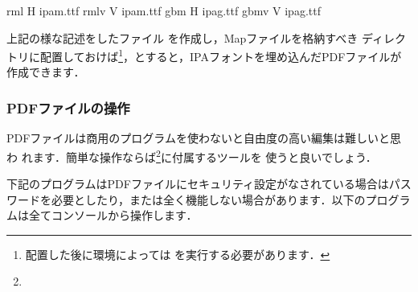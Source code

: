 \begin{plainfile}
rml  H ipam.ttf
rmlv V ipam.ttf
gbm  H ipag.ttf
gbmv V ipag.ttf
\end{plainfile}

上記の様な記述をしたファイル  を作成し，Mapファイルを格納すべき
ディレクトリに配置しておけば\footnote{配置した後に環境によっては
を実行する必要があります．}，とすると，IPAフォントを埋め込んだPDFファイルが作成できます．


\subsubsection{PDFファイルの操作}

PDFファイルは商用のプログラムを使わないと自由度の高い編集は難しいと思わ
れます．簡単な操作ならば\footnote{\webXpdf}に付属するツールを
使うと良いでしょう．

%
%

下記のプログラムはPDFファイルにセキュリティ設定がなされている場合はパス
ワードを必要としたり，または全く機能しない場合があります．以下のプログラ
ムは全てコンソールから操作します．

